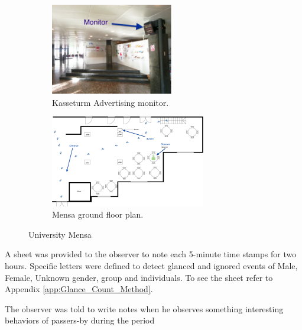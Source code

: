 

\begin{figure}[H]
\centering
    \begin{subfigure}[H]{0.45\textwidth}
        \centering
        \includegraphics[width=\textwidth,height=4cm]{Figures/3/Kasseturm_monitor}
        \caption{Kasseturm Advertising monitor.}
        \label{fig:kasseturm}
    \end{subfigure}
    \begin{subfigure}[H]{0.45\textwidth}
        \centering
        \includegraphics[width=\textwidth,height=4cm]{Figures/3/mensa_setup}
        \caption{Mensa ground floor plan.}
        \label{fig:mensasetup}
    \end{subfigure}
    \caption{University Mensa }
    \label{fig:observation_env}
\end{figure}


A sheet was provided to the observer to note each 5-minute time stamps for two hours. Specific letters were defined to detect glanced and ignored events of Male, Female, Unknown gender, group and individuals. To see the sheet refer to Appendix \ref{app:Glance_Count_Method}.

The observer was told to write notes when he observes something interesting behaviors of passers-by during the period



